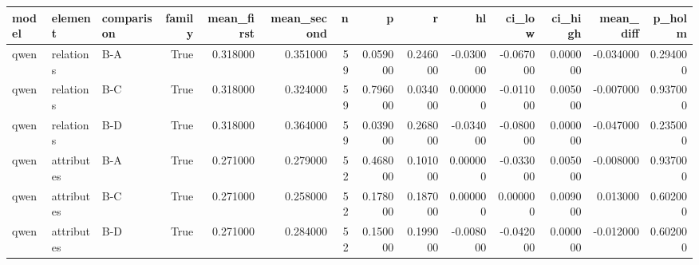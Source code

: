 \begin{tabular}{lllrrrrrrrrrrr}
\toprule
model & element & comparison & family & mean_first & mean_second & n & p & r & hl & ci_low & ci_high & mean_diff & p_holm \\
\midrule
qwen & relations & B-A & True & 0.318000 & 0.351000 & 59 & 0.059000 & 0.246000 & -0.030000 & -0.067000 & 0.000000 & -0.034000 & 0.294000 \\
qwen & relations & B-C & True & 0.318000 & 0.324000 & 59 & 0.796000 & 0.034000 & 0.000000 & -0.011000 & 0.005000 & -0.007000 & 0.937000 \\
qwen & relations & B-D & True & 0.318000 & 0.364000 & 59 & 0.039000 & 0.268000 & -0.034000 & -0.080000 & 0.000000 & -0.047000 & 0.235000 \\
qwen & attributes & B-A & True & 0.271000 & 0.279000 & 52 & 0.468000 & 0.101000 & 0.000000 & -0.033000 & 0.005000 & -0.008000 & 0.937000 \\
qwen & attributes & B-C & True & 0.271000 & 0.258000 & 52 & 0.178000 & 0.187000 & 0.000000 & 0.000000 & 0.009000 & 0.013000 & 0.602000 \\
qwen & attributes & B-D & True & 0.271000 & 0.284000 & 52 & 0.150000 & 0.199000 & -0.008000 & -0.042000 & 0.000000 & -0.012000 & 0.602000 \\
\bottomrule
\end{tabular}


